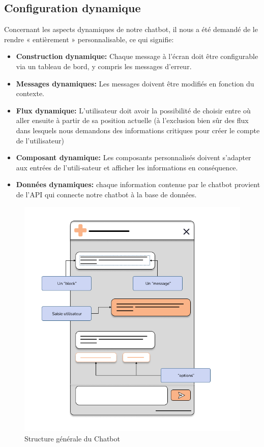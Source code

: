 \subsection{Configuration dynamique}

\hspace{16pt}Concernant les aspects dynamiques de notre chatbot, il nous a été demandé de le rendre « entièrement » personnalisable, ce qui signifie:

\begin{itemize}
  \item \textbf{Construction dynamique: }Chaque message à l'écran doit être configurable via un tableau de bord, y compris les messages d'erreur.
  \item \textbf{Messages dynamiques: }Les messages doivent être modifiés en fonction du contexte.
  \item \textbf{Flux dynamique: }L'utilisateur doit avoir la possibilité de choisir entre où aller ensuite à partir de sa position actuelle (à l'exclusion bien sûr des flux dans lesquels nous demandons des informations critiques pour créer le compte de l'utilisateur)
  \item \textbf{Composant dynamique: }Les composants personnalisés doivent s'adapter aux entrées de l'utili-sateur et afficher les informations en conséquence.
  \item \textbf{Données dynamiques: }chaque information contenue par le chatbot provient de l'API qui connecte notre chatbot à la base de données.
\end{itemize}


\begin{figure}[H] 
    \centering
    \includegraphics[scale=0.45]{Figures/cbs_general.png}
    \caption{Structure générale du Chatbot}
\end{figure}


